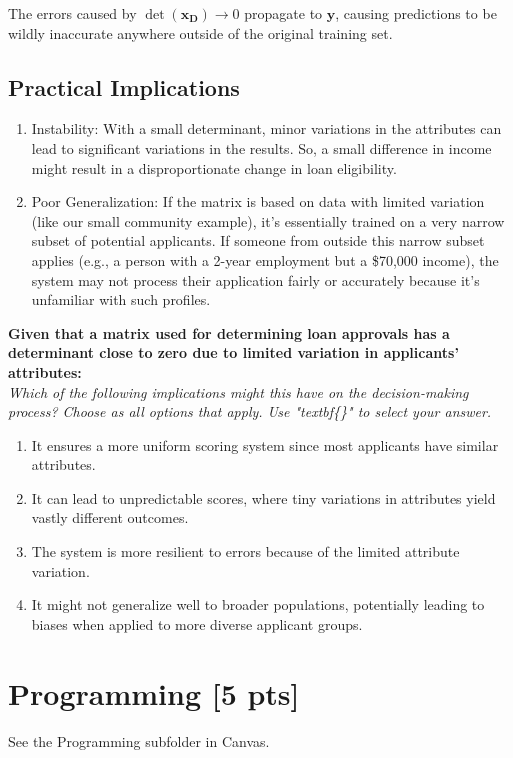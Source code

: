 \documentclass{article}
\begin{document}
The errors caused by $\det(\mathbf{x_D}) \rightarrow 0$ propagate to $\mathbf{y}$, causing predictions to be wildly inaccurate anywhere outside of the original training set.

\subsection*{Practical Implications}

\begin{enumerate}
    \item Instability: With a small determinant, minor variations in the attributes can lead to significant variations in the results. So, a small difference in income might result in a disproportionate change in loan eligibility.
    \item Poor Generalization: If the matrix is based on data with limited variation (like our small community example), it's essentially trained on a very narrow subset of potential applicants. If someone from outside this narrow subset applies (e.g., a person with a 2-year employment but a \$70,000 income), the system may not process their application fairly or accurately because it's unfamiliar with such profiles.
\end{enumerate}

\noindent
\textbf{Given that a matrix used for determining loan approvals has a determinant close to zero due to limited variation in applicants' attributes:} \\
\textit{Which of the following implications might this have on the decision-making process? Choose as all options that apply. Use "textbf\{\}" to select your answer.}
\begin{enumerate}[label=\Alph*)]
    \item It ensures a more uniform scoring system since most applicants have similar attributes.
    \item It can lead to unpredictable scores, where tiny variations in attributes yield vastly different outcomes.
    \item The system is more resilient to errors because of the limited attribute variation.
    \item It might not generalize well to broader populations, potentially leading to biases when applied to more diverse applicant groups.
\end{enumerate}

\newpage

\section{Programming [5 pts]}
See the Programming subfolder in Canvas.
\newpage
\end{document}
